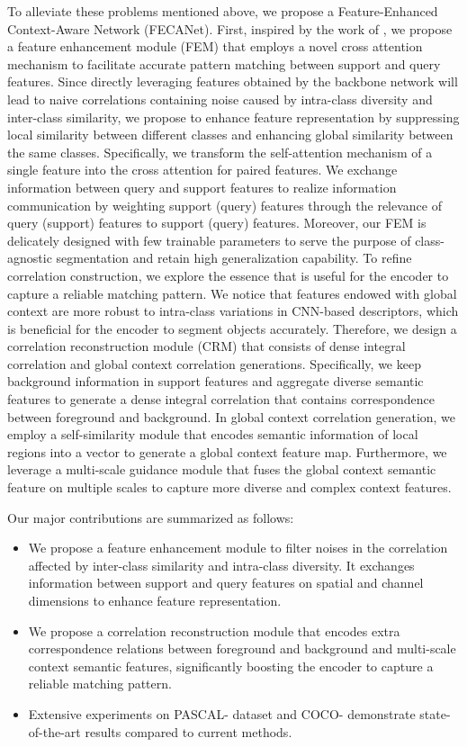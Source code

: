 \documentclass[journal]{IEEEtran}
\begin{document}
To alleviate these problems mentioned above, we propose a Feature-Enhanced Context-Aware Network (FECANet). First, inspired by the work of \cite{wang2018non, fu2019dual}, we propose a feature enhancement module (FEM) that employs a novel cross attention mechanism to facilitate accurate pattern matching between support and query features. Since directly leveraging features obtained by the backbone network will lead to naive correlations containing noise caused by intra-class diversity and inter-class similarity, we propose to enhance feature representation by suppressing local similarity between different classes and enhancing global similarity between the same classes. Specifically, we transform the self-attention mechanism of a single feature into the cross attention for paired features. We exchange information between query and support features to realize information communication by weighting support (query) features through the relevance of query (support) features to support (query) features. Moreover, our FEM is delicately designed with few trainable parameters to serve the purpose of class-agnostic segmentation and retain high generalization capability. To refine correlation construction, we explore the essence that is useful for the encoder to capture a reliable matching pattern. We notice that features endowed with global context are more robust to intra-class variations in CNN-based descriptors, which is beneficial for the encoder to segment objects accurately. Therefore, we design a correlation reconstruction module (CRM) that consists of dense integral correlation and global context correlation generations. Specifically, we keep background information in support features and aggregate diverse semantic features to generate a dense integral correlation that contains correspondence between foreground and background. In global context correlation generation, we employ a self-similarity module that encodes semantic information of local regions into a vector to generate a global context feature map. Furthermore, we leverage a multi-scale guidance module that fuses the global context semantic feature on multiple scales to capture more diverse and complex context features.

Our major contributions are summarized as follows: 
\begin{itemize}
\item We propose a feature enhancement module to filter noises in the correlation affected by inter-class similarity and intra-class diversity. It exchanges information between support and query features on spatial and channel dimensions to enhance feature representation.

\item We propose a correlation reconstruction module that encodes extra correspondence relations between foreground and background and multi-scale context semantic features, significantly boosting the encoder to capture a reliable matching pattern.

\item Extensive experiments on PASCAL- dataset and COCO- demonstrate state-of-the-art results compared to current methods.
\end{itemize}
\end{document}

